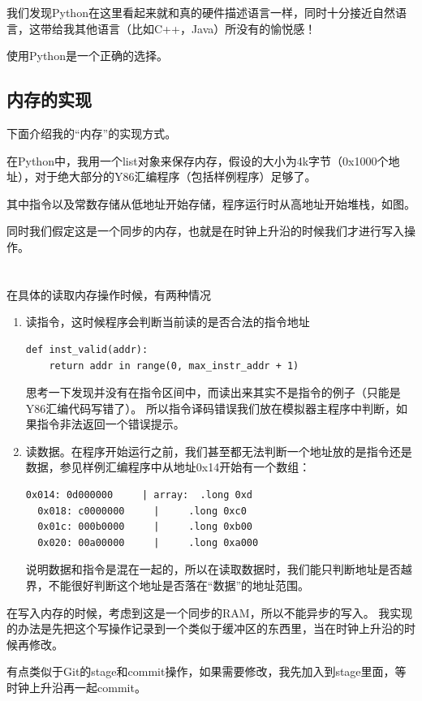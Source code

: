 \documentclass{article}
\begin{document}
我们发现Python在这里看起来就和真的硬件描述语言一样，同时十分接近自然语言，这带给我其他语言（比如C++，Java）所没有的愉悦感！

使用Python是一个正确的选择。

\subsection{内存的实现}
下面介绍我的“内存”的实现方式。

在Python中，我用一个list对象来保存内存，假设的大小为4k字节（0x1000个地址），对于绝大部分的Y86汇编程序（包括样例程序）足够了。

其中指令以及常数存储从低地址开始存储，程序运行时从高地址开始堆栈，如图。

同时我们假定这是一个同步的内存，也就是在时钟上升沿的时候我们才进行写入操作。
\\
\\
\\
\indent 在具体的读取内存操作时候，有两种情况
\begin{enumerate}
\item 读指令，这时候程序会判断当前读的是否合法的指令地址
\begin{lstlisting}[frame=single]
def inst_valid(addr):
	return addr in range(0, max_instr_addr + 1)
\end{lstlisting}
思考一下发现并没有在指令区间中，而读出来其实不是指令的例子（只能是Y86汇编代码写错了）。
所以指令译码错误我们放在模拟器主程序中判断，如果指令非法返回一个错误提示。

\item 读数据。在程序开始运行之前，我们甚至都无法判断一个地址放的是指令还是数据，参见样例汇编程序中从地址0x14开始有一个数组：
\begin{lstlisting}[frame=single]
  0x014: 0d000000     | array:	.long 0xd
  0x018: c0000000     | 	.long 0xc0
  0x01c: 000b0000     | 	.long 0xb00
  0x020: 00a00000     | 	.long 0xa000
\end{lstlisting}

说明数据和指令是混在一起的，所以在读取数据时，我们能只判断地址是否越界，不能很好判断这个地址是否落在“数据”的地址范围。
\end{enumerate}


在写入内存的时候，考虑到这是一个同步的RAM，所以不能异步的写入。
我实现的办法是先把这个写操作记录到一个类似于缓冲区的东西里，当在时钟上升沿的时候再修改。

有点类似于Git的stage和commit操作，如果需要修改，我先加入到stage里面，等时钟上升沿再一起commit。
\end{document}
